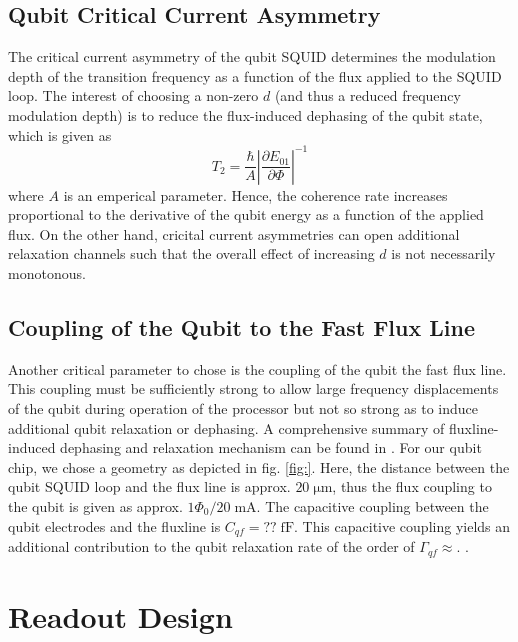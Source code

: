 \subsection{Qubit Critical Current Asymmetry}

The critical current asymmetry of the qubit SQUID determines the modulation depth of the transition frequency as a function of the flux applied to the SQUID loop. The interest of choosing a non-zero $d$ (and thus a reduced frequency modulation depth) is to reduce the flux-induced dephasing of the qubit state, which is given as \citep{koch_charge-insensitive_2007}
%
\begin{equation}
T_2 = \frac{\hbar}{A}\left|\frac{\partial E_{01}}{\partial \Phi}\right|^{-1}
\end{equation}
%
where $A$ is an emperical parameter. Hence, the coherence rate increases proportional to the derivative of the qubit energy as a function of the applied flux. On the other hand, cricital current asymmetries can open additional relaxation channels \citep{} such that the overall effect of increasing $d$ is not necessarily monotonous. 

\subsection{Coupling of the Qubit to the Fast Flux Line}

Another critical parameter to chose is the coupling of the qubit the fast flux line. This coupling must be sufficiently strong to allow large frequency displacements of the qubit during operation of the processor but not so strong as to induce additional qubit relaxation or dephasing. A comprehensive summary of fluxline-induced dephasing and relaxation mechanism can be found in \cite{koch_charge-insensitive_2007}. For our qubit chip, we chose a geometry as depicted in fig. \ref{fig:}. Here, the distance between the qubit SQUID loop and the flux line is approx. $20\;\mathrm{\mu m}$, thus the flux coupling to the qubit is given as approx. $1 \Phi_0 / 20\;\mathrm{mA}$. The capacitive coupling between the qubit electrodes and the fluxline is $C_{qf}=??\;\mathrm{fF}$. This capacitive coupling yields an additional contribution to the qubit relaxation rate of the order of $\Gamma_{qf}\approx$. .

\section{Readout Design}

